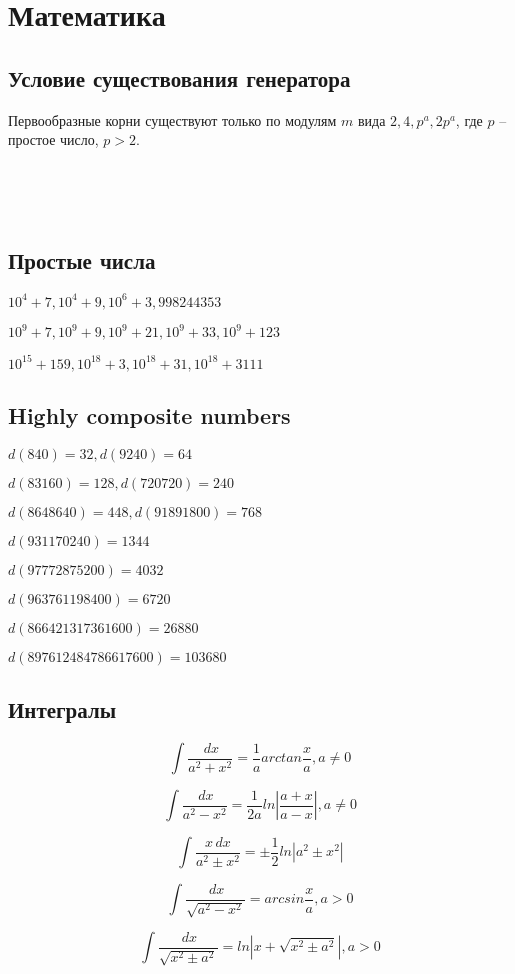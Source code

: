 \documentclass[14pt,a4paper,oneside]{article}
\begin{document}
\section{Математика}

\subsection{Условие существования генератора}
Первообразные корни существуют только по модулям $m$ вида $2, 4, p^a, 2p^a$, где $p$ -- простое число, $p > 2$.

~

~

\subsection{Простые числа}
$10^4 + 7, 10^4 + 9, 10^6 + 3, 998244353$

$10^9 + 7, 10^9 + 9, 10^9 + 21, 10^9 + 33, 10^9 + 123$

$10^{15} + 159, 10^{18} + 3, 10^{18} + 31, 10^{18} + 3111$

\subsection{Highly composite numbers}
$d(840) = 32, d(9240) = 64$

$d(83160) = 128, d(720720) = 240$

$d(8648640) = 448, d(91891800) = 768$

$d(931170240) = 1344$

$d(97772875200) = 4032$

$d(963761198400) = 6720$

$d(866421317361600) = 26880$

$d(897612484786617600) = 103680$

\subsection{Интегралы}

\[
\int \frac{\,dx}{a^2 + x^2} = \frac{1}{a}arctan\frac{x}{a}, a \ne 0
\]

\[
\int \frac{\,dx}{a^2 - x^2} = \frac{1}{2a}ln\left|\frac{a+x}{a-x}\right|, a \ne 0
\]
  
\[
\int \frac{x\,dx}{a^2 \pm x^2} = \pm\frac{1}{2}ln|a^2 \pm x^2|
\]

\[
\int \frac{\,dx}{\sqrt{a^2 - x^2}} = arcsin\frac{x}{a}, a > 0
\]
  
\[
\int \frac{\,dx}{\sqrt{x^2 \pm a^2}} = ln\left|x + \sqrt{x^2 \pm a^2}\right|, a > 0
\]
\end{document}
